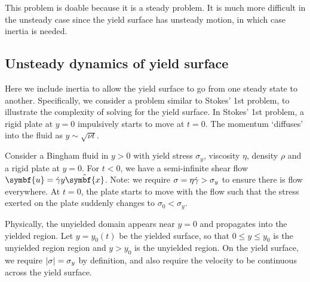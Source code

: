 \documentclass{jknotes}
\begin{document}
This problem is doable because it is a steady problem. It is much more
difficult in the unsteady case since the yield surface has unsteady motion, in
which case inertia is needed.

\subsection{Unsteady dynamics of yield surface}
Here we include inertia to allow the yield surface to go from one steady state
to another. Specifically, we consider a problem similar to Stokes' 1st
problem, to illustrate the complexity of solving for the yield surface. In
Stokes' 1st problem, a rigid plate at $y=0$ impulsively starts to move at
$t=0$. The momentum `diffuses' into the fluid as $y \sim \sqrt{\nu t}$.

Consider a Bingham fluid in $y > 0$ with yield stress $\sigma_y$, viscosity
$\eta$, density $\rho$ and a rigid plate at $y=0$. For $t < 0$, we have a
semi-infinite shear flow $\symbf{u} = \srate y \hat{\symbf{x}}$. Note: we require
$\sigma = \eta \dot{\gamma} > \sigma_y$ to ensure there is flow everywhere. At
$t=0$, the plate starts to move with the flow such that the stress exerted on
the plate suddenly changes to $\sigma_0 < \sigma_y$. 

\begin{center}
\end{center}

Physically, the unyielded domain appears near $y=0$ and propagates into the
yielded region. Let $y=y_0(t)$ be the yielded surface, so that $0 \le y \le
y_0$ is the unyielded region region and $y > y_0$ is the unyielded region. On
the yield surface, we require $\abs{\sigma} = \sigma_y$ by definition, and
also require the velocity to be continuous across the yield surface.
\end{document}
